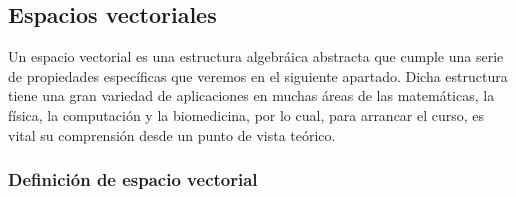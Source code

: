 \documentclass[12pt]{article}
\begin{document}
\newpage
\subsection{Espacios vectoriales}

Un espacio vectorial es una estructura algebráica abstracta que cumple una serie de propiedades específicas que veremos en el siguiente apartado. Dicha estructura tiene una gran variedad de aplicaciones en muchas áreas de las matemáticas, la física, la computación y la biomedicina, por lo cual, para arrancar el curso, es vital su comprensión desde un punto de vista teórico.

\subsubsection{Definición de espacio vectorial} \label{Def:Espacio_vectorial}
\end{document}
